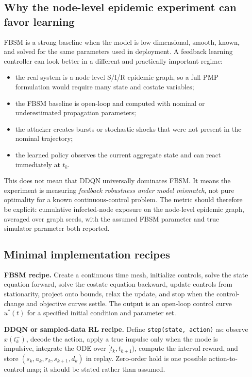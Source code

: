 \documentclass[11pt,a4paper]{article}
\begin{document}
\subsection{Why the node-level epidemic experiment can favor learning}
FBSM is a strong baseline when the model is low-dimensional, smooth, known, and solved for the same parameters used in deployment. A feedback learning controller can look better in a different and practically important regime:
\begin{itemize}
\item the real system is a node-level S/I/R epidemic graph, so a full PMP formulation would require many state and costate variables;
\item the FBSM baseline is open-loop and computed with nominal or underestimated propagation parameters;
\item the attacker creates bursts or stochastic shocks that were not present in the nominal trajectory;
\item the learned policy observes the current aggregate state and can react immediately at $t_k$.
\end{itemize}

This does not mean that DDQN universally dominates FBSM. It means the experiment is measuring \emph{feedback robustness under model mismatch}, not pure optimality for a known continuous-control problem. The metric should therefore be explicit: cumulative infected-node exposure on the node-level epidemic graph, averaged over graph seeds, with the assumed FBSM parameter and true simulator parameter both reported.

\subsection{Minimal implementation recipes}
\begin{methodbox}
\textbf{FBSM recipe.}
Create a continuous time mesh, initialize controls, solve the state equation forward, solve the costate equation backward, update controls from stationarity, project onto bounds, relax the update, and stop when the control-change and objective curves settle. The output is an open-loop control curve $u^*(t)$ for a specified initial condition and parameter set.
\end{methodbox}

\begin{methodbox}
\textbf{DDQN or sampled-data RL recipe.}
Define \texttt{step(state, action)} as: observe $x(t_k^-)$, decode the action, apply a true impulse only when the mode is impulsive, integrate the ODE over $[t_k,t_{k+1})$, compute the interval reward, and store $(s_k,a_k,r_k,s_{k+1},d_k)$ in replay. Zero-order hold is one possible action-to-control map; it should be stated rather than assumed.
\end{methodbox}
\end{document}
